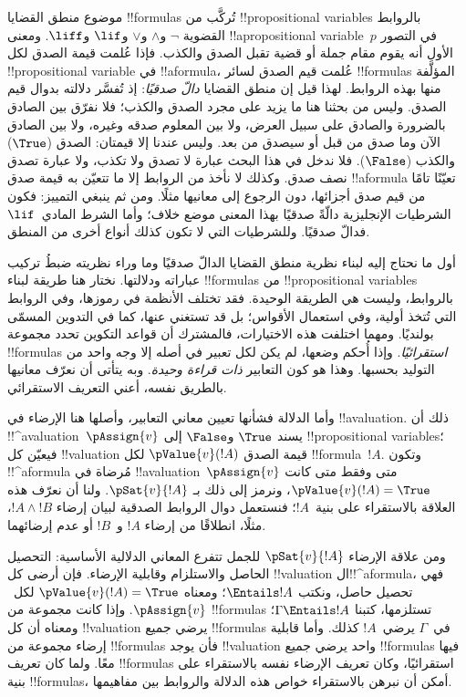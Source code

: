 \documentclass[../../../include/open-logic-section]{subfiles}
\begin{document}


موضوع منطق القضايا !!{formula}s تُركَّب من
!!{propositional variable}s بالروابط القضوية
$\lnot$ و$\land$ و$\lor$ و$\lif$ و$\liff$. ومعنى
!!a{propositional variable}~$p$ في التصور الأول أنه يقوم مقام جملة أو قضية تقبل الصدق والكذب.
فإذا عُلمت قيمة الصدق لكل !!{propositional variable} في
!!a{formula}، عُلمت قيم الصدق لسائر !!{formula}s المؤلَّفة منها بهذه الروابط. لهذا قيل إن منطق القضايا
\emph{دالّ صدقيًا}: إذ تُفسَّر دلالته بدوال قيم الصدق. وليس من بحثنا هنا ما يزيد على مجرد الصدق والكذب؛ فلا نفرّق بين الصادق بالضرورة والصادق على سبيل العرض، ولا بين المعلوم صدقه وغيره، ولا بين الصادق الآن وما صدق من قبل أو سيصدق من بعد. وليس عندنا إلا قيمتان: الصدق
($\True$) والكذب ($\False$). فلا ندخل في هذا البحث عبارة لا تصدق ولا تكذب، ولا عبارة تصدق نصف صدق.
وكذلك لا نأخذ من الروابط إلا ما تتعيّن به قيمة صدق
!!a{formula} تعيّنًا تامًا من قيم صدق أجزائها، دون الرجوع إلى معانيها مثلًا. ومن ثم ينبغي التمييز: فكون الشرطيات الإنجليزية دالّةً صدقيًا بهذا المعنى موضع خلاف؛ وأما الشرط المادي~$\lif$ فدالّ صدقيًا. وللشرطيات التي لا تكون كذلك أنواع أخرى من المنطق.

أول ما نحتاج إليه لبناء نظرية منطق القضايا الدالّ صدقيًا وما وراء نظريته ضبطُ تركيب عباراته ودلالتها. نختار هنا طريقة لبناء
!!{formula}s من !!{propositional variable}s بالروابط، وليست هي الطريقة الوحيدة. فقد تختلف الأنظمة في رموزها، وفي الروابط التي تُتخذ أولية، وفي استعمال الأقواس؛ بل قد تستغني عنها، كما في التدوين المسمّى بولنديًا.
ومهما اختلفت هذه الاختيارات، فالمشترك أن قواعد التكوين تحدد مجموعة
!!{formula}s \emph{استقرائيًا}. وإذا أُحكم وضعها، لم يكن لكل تعبير في أصله إلا وجه واحد من التوليد بحسبها. وهذا هو كون التعابير
\emph{ذات قراءة وحيدة}. وبه يتأتى أن نعرّف معانيها بالطريق نفسه، أعني التعريف الاستقرائي.

وأما الدلالة فشأنها تعيين معاني التعابير، وأصلها هنا الإرضاء في
!!a{valuation}. ذلك أن !!^a{valuation}~$\pAssign{v}$ يسند
$\True$ و$\False$ إلى !!{propositional variable}s؛ فيعيّن كل
!!{valuation} قيمة الصدق $\pValue{v}(!A)$ لكل
!!{formula}~$!A$. وتكون !!^a{formula} مُرضاة في
!!a{valuation}~$\pAssign{v}$ متى وفقط متى كانت
$\pValue{v}(!A) = \True$، ونرمز إلى ذلك بـ
$\pSat{v}{!A}$. ولنا أن نعرّف هذه العلاقة بالاستقراء على بنية~$!A$؛ فنستعمل دوال الروابط الصدقية لبيان إرضاء
$!A \land !B$، مثلًا، انطلاقًا من إرضاء $!A$ و~$!B$ أو عدم إرضائهما.

ومن علاقة الإرضاء $\pSat{v}{!A}$ للجمل تتفرع المعاني الدلالية الأساسية: التحصيل الحاصل والاستلزام وقابلية الإرضاء. فإن أرضى كل
!!{valuation} ال!!^a{formula}، فهي تحصيل حاصل، ونكتب
$\Entails !A$؛ ومعناه $\pValue{v}(!A) = \True$ لكل~$\pAssign{v}$.
وإذا كانت مجموعة من !!{formula}s تستلزمها، كتبنا
$\Gamma \Entails !A$؛ ومعناه أن كل !!{valuation} يرضي جميع
!!{formula}s في~$\Gamma$ يرضي~$!A$ كذلك.
وأما قابلية إرضاء مجموعة من !!{formula}s فأن يوجد
!!{valuation} واحد يرضي جميع !!{formula}s فيها معًا.
ولما كان تعريف !!{formula}s استقرائيًا، وكان تعريف الإرضاء نفسه بالاستقراء على بنية
!!{formula}s، أمكن أن نبرهن بالاستقراء خواص هذه الدلالة والروابط بين مفاهيمها.
\end{document}
